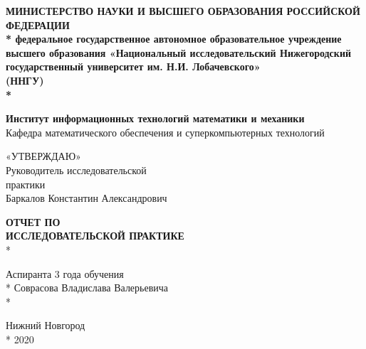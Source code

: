 \begin{titlepage}

\begin{center}
  \fontsize{12pt}{0pt}
\textbf{
  МИНИСТЕРСТВО НАУКИ И ВЫСШЕГО ОБРАЗОВАНИЯ РОССИЙСКОЙ ФЕДЕРАЦИИ \\*
  федеральное государственное автономное образовательное учреждение
  высшего образования «Национальный исследовательский Нижегородский
  государственный университет им. Н.И. Лобачевского»\\
  (ННГУ)\\*}
\end{center}

\vspace{12pt}
\vspace{25pt}
\begin{center}
\fontsize{12pt}{0pt}
\textbf{Институт информационных технологий математики и механики\\}
Кафедра математического обеспечения и суперкомпьютерных технологий
\end{center}
\vspace{30pt}

\begin{flushright}
«УТВЕРЖДАЮ» \\
Руководитель исследовательской \\
практики  \\
Баркалов Константин Александрович\\
 
\end{flushright}

\vspace{30pt}

\begin{center}
\fontsize{11pt}{0pt}\textbf{ОТЧЕТ ПО \\
ИССЛЕДОВАТЕЛЬСКОЙ ПРАКТИКЕ } \\*
\end{center}
\fontsize{12pt}{0pt}
\begin{flushright}
Аспиранта 3 года обучения \\*
Соврасова Владислава Валерьевича \\*
 
\end{flushright}

\vspace{\fill}

\begin{center}
Нижний Новгород \\*
2020
\end{center}

\end{titlepage}
